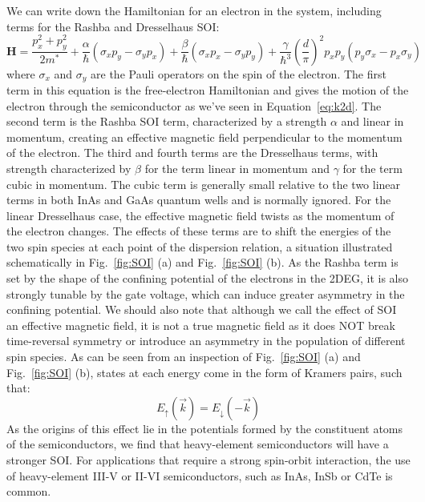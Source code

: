 We can write down the Hamiltonian for an electron in the system, including terms for the Rashba and Dresselhaus SOI:
\begin{equation}
  \mathbf{H} = \frac{p_x^2 + p_y^2}{2m^*} + \frac{\alpha}{\hbar}(\sigma_xp_y - \sigma_yp_x) + \frac{\beta}{\hbar}(\sigma_x p_x - \sigma_y p_y) +
  \frac{\gamma}{\hbar^3}\left(\frac{d}{\pi}\right)^2 p_x p_y (p_y\sigma_x-p_x\sigma_y)
\end{equation}
where $\sigma_x$ and $\sigma_y$ are the Pauli operators on the spin of the electron. The first term in this equation is the free-electron Hamiltonian and gives the motion of the electron through the semiconductor as we've seen in Equation~\ref{eq:k2d}. The second term is the Rashba SOI term, characterized
by a strength $\alpha$ and linear in momentum, creating an effective magnetic field perpendicular to the momentum of the electron. The third and fourth terms
are the Dresselhaus terms, with strength characterized by $\beta$ for the term linear in momentum and $\gamma$ for the term cubic in momentum. The cubic term is
generally small relative to the two linear terms in both InAs and GaAs quantum wells and is normally ignored. For the linear Dresselhaus case, the effective magnetic field twists
as the momentum of the electron changes\cite{PhysRev.100.580}. The effects of these terms are to shift the energies of the two spin species at each point of the dispersion
relation, a situation illustrated schematically in Fig.~\ref{fig:SOI} (a) and Fig.~\ref{fig:SOI} (b). As the Rashba term is set by the shape
of the confining potential of the electrons in the 2DEG, it is also strongly tunable by the gate voltage, which can induce greater asymmetry in the confining potential.
We should also note that although we call the effect of SOI an effective magnetic field, it is not a true magnetic field as
it does NOT break time-reversal symmetry or introduce an asymmetry in the population of different spin species. As can be seen from an inspection of
Fig.~\ref{fig:SOI} (a) and Fig.~\ref{fig:SOI} (b), states at each energy come in the form of Kramers pairs, such that:
\begin{equation}
  E_\uparrow(\vec k) = E_\downarrow(-\vec k)
\end{equation}
As the origins of this effect lie in the potentials formed by the constituent atoms of the semiconductors, we find that heavy-element semiconductors
will have a stronger SOI. For applications that require a strong spin-orbit interaction, the use of heavy-element III-V or II-VI semiconductors, such
as InAs, InSb or CdTe is common.


